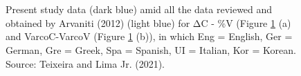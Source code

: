 \begin{figure}
\centering
{}\\
\\
\caption{Present study data (dark blue) amid all the data reviewed and obtained
by Arvaniti (2012) (light blue) for ΔC - \%V (Figure \ref{leo-fig02} (a) and
VarcoC-VarcoV (Figure \ref{leo-fig02} (b)), in which Eng = English, Ger = German,
Gre = Greek, Spa = Spanish, UI = Italian, Kor = Korean. Source: Teixeira and Lima Jr. (2021).}
\label{leo-fig02}
\end{figure}


